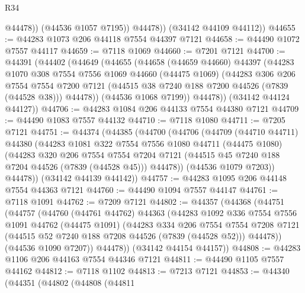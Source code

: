 \begin{lexlean}{R34}
\begin{coremodule}
                @44478))
            (@44536 @1057 @7195))
          @44478))
      (@34142 @44109 @44112))
@44655 := @44283 @1073 @206 @44118 @7554 @44397 @7121
@44658 := @44490 @1072 @7557 @44117
@44659 := @7118 @1069
@44660 := @7201 @7121
@44700 := @44391
    (@44402
      (@44649
        (@44655
          (@44658
            (@44659 @44660)
            @44397
            (@44283
              @1070
              @308
              @7554
              @7556
              @1069
              @44660
              (@44475 @1069)
              (@44283
                @306
                @206
                @7554
                @7554
                @7200
                @7121
                (@44515 @38 @7240 @188 @7200 @44526 (@7839 (@44528 @38)))
                @44478))
            (@44536 @1068 @7199))
          @44478))
      (@34142 @44124 @44127))
@44706 := @44283 @1084 @206 @44133 @7554 @44380 @7121
@44709 := @44490 @1083 @7557 @44132
@44710 := @7118 @1080
@44711 := @7205 @7121
@44751 := @44374
    (@44385
      (@44700
        (@44706
          (@44709
            (@44710 @44711)
            @44380
            (@44283
              @1081
              @322
              @7554
              @7556
              @1080
              @44711
              (@44475 @1080)
              (@44283
                @320
                @206
                @7554
                @7554
                @7204
                @7121
                (@44515 @45 @7240 @188 @7204 @44526 (@7839 (@44528 @45)))
                @44478))
            (@44536 @1079 @7203))
          @44478))
      (@34142 @44139 @44142))
@44757 := @44283 @1095 @206 @44148 @7554 @44363 @7121
@44760 := @44490 @1094 @7557 @44147
@44761 := @7118 @1091
@44762 := @7209 @7121
@44802 := @44357
    (@44368
      (@44751
        (@44757
          (@44760
            (@44761 @44762)
            @44363
            (@44283
              @1092
              @336
              @7554
              @7556
              @1091
              @44762
              (@44475 @1091)
              (@44283
                @334
                @206
                @7554
                @7554
                @7208
                @7121
                (@44515 @52 @7240 @188 @7208 @44526 (@7839 (@44528 @52)))
                @44478))
            (@44536 @1090 @7207))
          @44478))
      (@34142 @44154 @44157))
@44808 := @44283 @1106 @206 @44163 @7554 @44346 @7121
@44811 := @44490 @1105 @7557 @44162
@44812 := @7118 @1102
@44813 := @7213 @7121
@44853 := @44340
    (@44351
      (@44802
        (@44808
          (@44811

\end{coremodule}
\end{lexlean}
